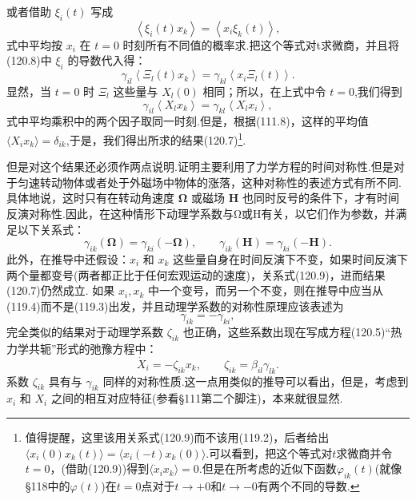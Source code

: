 或者借助 $\xi_i(t)$ 写成
\begin{equation}
  \left\langle\xi_i(t)x_k\right\rangle=\left\langle x_i\xi_k(t)\right\rangle,
\end{equation}
式中平均按 $x_i$ 在 $t=0$ 时刻所有不同值的概率求.把这个等式对t求微商，并且将(120.8)中 $\xi_i$ 的导数代入得：
\begin{equation*}
  \gamma_{il}\left\langle\Xi_l(t)x_k\right\rangle
  =\gamma_{kl}\left\langle x_i\Xi_l(t)\right\rangle.
\end{equation*}
显然，当 $t=0$ 时 $\Xi_l$ 这些量与 $X_l(0)$ 相同；所以，在上式中令 $t=0$,我们得到
\begin{equation*}
  \gamma_{il}\left\langle X_lx_k\right\rangle
  =\gamma_{kl}\left\langle X_lx_i\right\rangle,
\end{equation*}
式中平均乘积中的两个因子取同一时刻.但是，根据(111.8)，这样的平均值 $\langle X_ix_k\rangle=\delta_{ik}$,于是，我们得出所求的结果(120.7)\footnote{值得提醒，这里该用关系式(120.9)而不该用(119.2)，后者给出$\langle x_i(0)x_k(t)\rangle=\langle x_i(-t)x_k(0)\rangle$.可以看到，把这个等式对$t$求微商并令$t=0$，(借助(120.9))得到$\langle\dot{x}_i x_k\rangle=0$.但是在所考虑的近似下函数$\varphi_{ik}(t)$(就像§118中的$\varphi(t)$)在$t=0$点对于$t\to+0$和$t\to-0$有两个不同的导数.}.

但是对这个结果还必须作两点说明.证明主要利用了力学方程的时间对称性.但是对于匀速转动物体或者处于外磁场中物体的涨落，这种对称性的表述方式有所不同.具体地说，这时只有在转动角速度 $\boldsymbol{\Omega}$ 或磁场 $\boldsymbol{H}$ 也同时反号的条件下，才有时间反演对称性.因此，在这种情形下动理学系数与Ω或H有关，以它们作为参数，并满足以下关系式：
\begin{equation}
  \gamma_{ik}(\boldsymbol{\Omega})=\gamma_{ki}(-\boldsymbol{\Omega}),\qquad
  \gamma_{ik}(\boldsymbol{H})=\gamma_{ki}(-\boldsymbol{H}).
\end{equation}
此外，在推导中还假设：$x_i$ 和 $x_k$ 这些量自身在时间反演下不变，如果时间反演下两个量都变号(两者都正比于任何宏观运动的速度)，关系式(120.9)，进而结果(120.7)仍然成立. 如果 $x_i,x_k$ 中一个变号，而另一个不变，则在推导中应当从(119.4)而不是(119.3)出发，并且动理学系数的对称性原理应该表述为
\begin{equation}
  \gamma_{ik}=-\gamma_{ki},
\end{equation}
完全类似的结果对于动理学系数 $\zeta_{ik}$ 也正确，这些系数出现在写成方程(120.5)“热力学共轭”形式的弛豫方程中：
\begin{equation}
  \dot{X}_i=-\zeta_{ik}x_k,\qquad
  \zeta_{ik}=\beta_{il}\gamma_{lk}.
\end{equation}
系数 $\zeta_{ik}$ 具有与 $\gamma_{ik}$ 同样的对称性质.这一点用类似的推导可以看出，但是，考虑到 $x_i$ 和 $X_i$ 之间的相互对应特征(参看§111第二个脚注)，本来就很显然.

